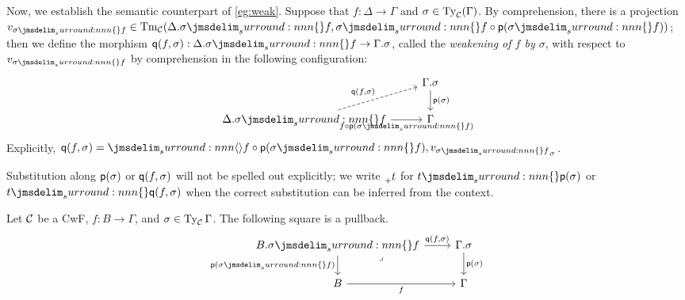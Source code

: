 \documentclass[a4paper]{article}
\begin{document}
Now, we establish the semantic counterpart of \cref{eg:weak}.
Suppose that $f : \Delta \to \Gamma$ and $\sigma \in \operatorname{Ty}_{\mathcal{C}}(\Gamma)$.
By comprehension, there is a projection $v_{\semSubst{\sigma}{f}} \in \Tm{\cC}(\Delta.\semSubst{\sigma}{f},\semSubst{\sigma}{f \circ \ctxExt(\semSubst{\sigma}{f})})$; then we define the morphism $\ctxWkn(f,\sigma) : \Delta.\semSubst{\sigma}{f} \to \Gamma.\sigma$, called the \emph{weakening of $f$ by $\sigma$}, with respect to $v_{\semSubst{\sigma}{f}}$ by comprehension in the following configuration:
\[\begin{tikzcd}
    & {\Gamma.\sigma} \\
    {\Delta.\semSubst{\sigma}{f}} & \Gamma
    \arrow["{\ctxExt(\sigma)}", from=1-2, to=2-2]
    \arrow["{\ctxWkn(f,\sigma)}", dashed, from=2-1, to=1-2]
    \arrow["{f \circ \ctxExt(\semSubst{\sigma}{f})}"', from=2-1, to=2-2]
  \end{tikzcd}\]
Explicitly, $\ctxWkn(f,\sigma) = \semComp{f \circ \ctxExt(\semSubst{\sigma}{f})}{v_{\semSubst{\sigma}{f}}}{\sigma}$.

\begin{notation}
  Substitution along $\operatorname{\mathsf{p}}(\sigma)$ or $\operatorname{\mathsf{q}}(f,\sigma)$ will not be spelled out explicitly; we write $\prescript{}{+}{t}$ for $\semSubst{t}{\ctxExt(\sigma)}$ or $\semSubst{t}{\ctxWkn(f,\sigma)}$ when the correct substitution can be inferred from the context.
\end{notation}

\begin{proposition}
  Let $\mathcal{C}$ be a CwF, $f : B \to \Gamma$, and $\sigma \in \operatorname{Ty}_{\mathcal{C}}{\Gamma}$.
  The following square is a pullback.
  \[\begin{tikzcd}
      {B.\semSubst{\sigma}{f}} & {\Gamma.\sigma} \\
      B & \Gamma
      \arrow["{\ctxWkn(f,\sigma)}", from=1-1, to=1-2]
      \arrow["{\ctxExt(\semSubst{\sigma}{f})}"', from=1-1, to=2-1]
      \arrow["\lrcorner"{anchor=center, pos=0.125}, draw=none, from=1-1, to=2-2]
      \arrow["{\ctxExt(\sigma)}", from=1-2, to=2-2]
      \arrow["f"', from=2-1, to=2-2]
    \end{tikzcd}\]
\end{proposition}
\end{document}
